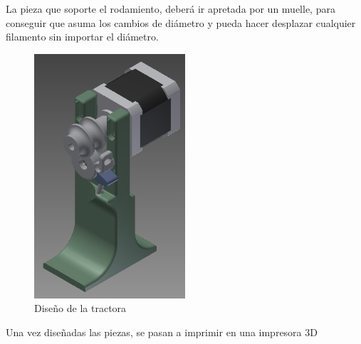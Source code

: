 La pieza que soporte el rodamiento, deberá ir apretada por un muelle, para conseguir que asuma los cambios de diámetro y pueda hacer desplazar cualquier filamento sin importar el diámetro.

	\begin{figure}[H]
            \centering
            \includegraphics[width=0.5\textwidth]{images/producciones/tractora/asembli.png}
            \caption{Diseño de la tractora}
            \label{fig:tractora2}
    \end{figure}

Una vez diseñadas las piezas, se pasan a imprimir en una impresora 3D

